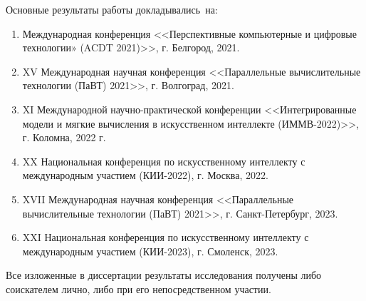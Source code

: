 {\probation}
Основные результаты работы докладывались~на:
\begin{enumerate}
	\item Международная конференция <<Перспективные компьютерные и цифровые технологии» (ACDT 2021)>>,
	г. Белгород, 2021.
	\item XV Международная научная конференция <<Параллельные вычислительные технологии (ПаВТ) 2021>>, г. Волгоград, 2021.
	\item XI Международной научно-практической конференции <<Интегрированные модели и мягкие вычисления в искусственном интеллекте (ИММВ-2022)>>, г. Коломна, 2022 г.
	\item XX Национальная конференция по искусственному интеллекту с международным участием (КИИ-2022), г. Москва, 2022.
	\item XVII Международная научная конференция <<Параллельные вычислительные технологии (ПаВТ) 2021>>, г. Санкт-Петербург, 2023.
	\item XXI Национальная конференция по искусственному интеллекту с международным участием (КИИ-2023), г. Смоленск, 2023.
\end{enumerate}

{\contribution} Все изложенные в диссертации результаты исследования получены либо соискателем лично, либо при его непосредственном участии.

